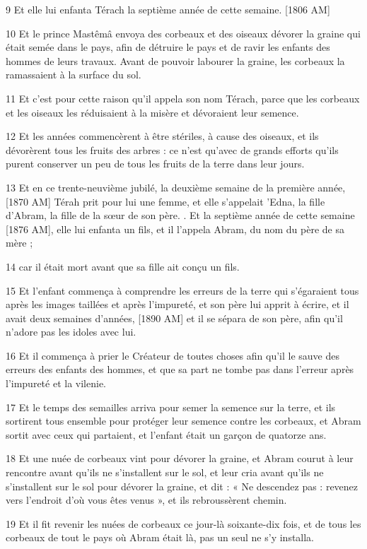 \par 9 Et elle lui enfanta Térach la septième année de cette semaine. [1806 AM]
\par 10 Et le prince Mastêmâ envoya des corbeaux et des oiseaux dévorer la graine qui était semée dans le pays, afin de détruire le pays et de ravir les enfants des hommes de leurs travaux. Avant de pouvoir labourer la graine, les corbeaux la ramassaient à la surface du sol.
\par 11 Et c'est pour cette raison qu'il appela son nom Térach, parce que les corbeaux et les oiseaux les réduisaient à la misère et dévoraient leur semence.
\par 12 Et les années commencèrent à être stériles, à cause des oiseaux, et ils dévorèrent tous les fruits des arbres : ce n'est qu'avec de grands efforts qu'ils purent conserver un peu de tous les fruits de la terre dans leur jours.
\par 13 Et en ce trente-neuvième jubilé, la deuxième semaine de la première année, [1870 AM] Térah prit pour lui une femme, et elle s'appelait 'Edna, la fille d'Abram, la fille de la sœur de son père. . Et la septième année de cette semaine [1876 AM], elle lui enfanta un fils, et il l'appela Abram, du nom du père de sa mère ;
\par 14 car il était mort avant que sa fille ait conçu un fils.
\par 15 Et l'enfant commença à comprendre les erreurs de la terre qui s'égaraient tous après les images taillées et après l'impureté, et son père lui apprit à écrire, et il avait deux semaines d'années, [1890 AM] et il se sépara de son père, afin qu'il n'adore pas les idoles avec lui.
\par 16 Et il commença à prier le Créateur de toutes choses afin qu'il le sauve des erreurs des enfants des hommes, et que sa part ne tombe pas dans l'erreur après l'impureté et la vilenie.
\par 17 Et le temps des semailles arriva pour semer la semence sur la terre, et ils sortirent tous ensemble pour protéger leur semence contre les corbeaux, et Abram sortit avec ceux qui partaient, et l'enfant était un garçon de quatorze ans.
\par 18 Et une nuée de corbeaux vint pour dévorer la graine, et Abram courut à leur rencontre avant qu'ils ne s'installent sur le sol, et leur cria avant qu'ils ne s'installent sur le sol pour dévorer la graine, et dit : « Ne descendez pas : revenez vers l'endroit d'où vous êtes venus », et ils rebroussèrent chemin.
\par 19 Et il fit revenir les nuées de corbeaux ce jour-là soixante-dix fois, et de tous les corbeaux de tout le pays où Abram était là, pas un seul ne s'y installa.
